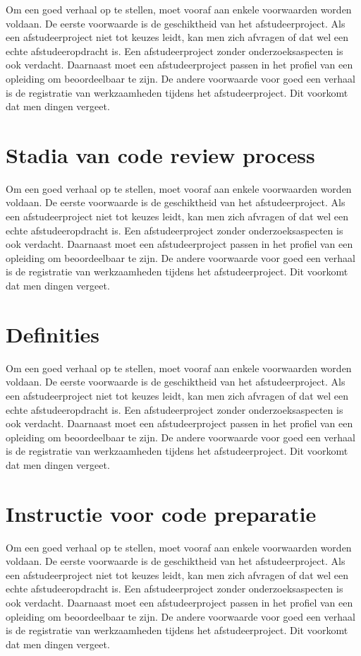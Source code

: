 			Om een goed verhaal op te stellen, moet vooraf aan enkele voorwaarden
			worden voldaan. De eerste voorwaarde is de geschiktheid van het
			afstudeerproject. Als een afstudeerproject niet tot keuzes leidt, kan
			men zich afvragen of dat wel een echte afstudeeropdracht is. Een
			afstudeerproject zonder onderzoeksaspecten is ook verdacht. Daarnaast
			moet een afstudeerproject passen in het profiel van een opleiding om
			beoordeelbaar te zijn. De andere voorwaarde voor goed een verhaal is
			de registratie van werkzaamheden tijdens het afstudeerproject. Dit
			voorkomt dat men dingen vergeet.
			\section{Stadia van code review process}
			
			Om een goed verhaal op te stellen, moet vooraf aan enkele voorwaarden
			worden voldaan. De eerste voorwaarde is de geschiktheid van het
			afstudeerproject. Als een afstudeerproject niet tot keuzes leidt, kan
			men zich afvragen of dat wel een echte afstudeeropdracht is. Een
			afstudeerproject zonder onderzoeksaspecten is ook verdacht. Daarnaast
			moet een afstudeerproject passen in het profiel van een opleiding om
			beoordeelbaar te zijn. De andere voorwaarde voor goed een verhaal is
			de registratie van werkzaamheden tijdens het afstudeerproject. Dit
			voorkomt dat men dingen vergeet.
			\section{Definities}
			
			Om een goed verhaal op te stellen, moet vooraf aan enkele voorwaarden
			worden voldaan. De eerste voorwaarde is de geschiktheid van het
			afstudeerproject. Als een afstudeerproject niet tot keuzes leidt, kan
			men zich afvragen of dat wel een echte afstudeeropdracht is. Een
			afstudeerproject zonder onderzoeksaspecten is ook verdacht. Daarnaast
			moet een afstudeerproject passen in het profiel van een opleiding om
			beoordeelbaar te zijn. De andere voorwaarde voor goed een verhaal is
			de registratie van werkzaamheden tijdens het afstudeerproject. Dit
			voorkomt dat men dingen vergeet.
			\section{Instructie voor code preparatie}
			
			Om een goed verhaal op te stellen, moet vooraf aan enkele voorwaarden
			worden voldaan. De eerste voorwaarde is de geschiktheid van het
			afstudeerproject. Als een afstudeerproject niet tot keuzes leidt, kan
			men zich afvragen of dat wel een echte afstudeeropdracht is. Een
			afstudeerproject zonder onderzoeksaspecten is ook verdacht. Daarnaast
			moet een afstudeerproject passen in het profiel van een opleiding om
			beoordeelbaar te zijn. De andere voorwaarde voor goed een verhaal is
			de registratie van werkzaamheden tijdens het afstudeerproject. Dit
			voorkomt dat men dingen vergeet.
